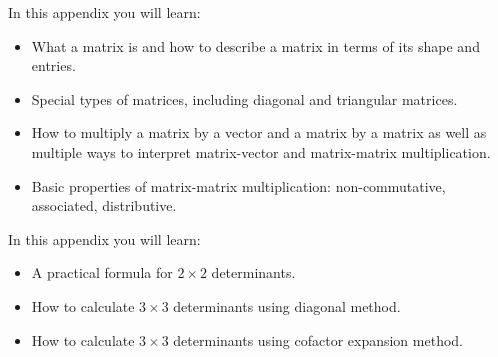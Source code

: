 \begin{appendix}
	In this appendix you will learn:
\begin{itemize}
  \item What a matrix is and how to describe a matrix in terms of its shape and entries.
  \item Special types of matrices, including diagonal and triangular matrices.
  \item How to multiply a matrix by a vector and a matrix by a matrix as well as multiple ways to
	  interpret matrix-vector and matrix-matrix multiplication.
  \item Basic properties of matrix-matrix multiplication: non-commutative, associated, distributive.
\end{itemize}



\end{appendix}

\begin{appendix}
	In this appendix you will learn:
\begin{itemize}
  \item A practical formula for $2\times 2$ determinants.
  \item How to calculate $3\times 3$ determinants using diagonal method.
  \item How to calculate $3\times 3$ determinants using cofactor expansion method.
\end{itemize}



\end{appendix}

